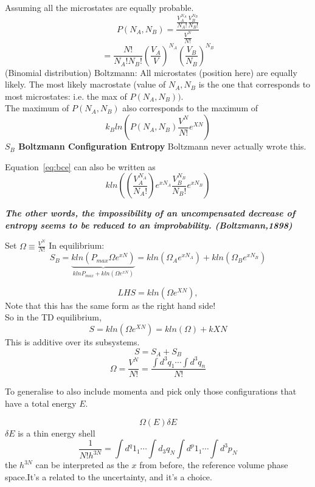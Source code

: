 \documentclass[11pt]{book}
\theoremstyle{definition}
\begin{document}
Assuming all the microstates are equally probable.
\[ P(N_A, N_B) = \frac{ \frac{V_A^{N_A}}{N_A!} \frac{V_B^{N_B}}{N_B!} } {\frac{V^{N}}{N!}}\] 
\[ = \frac{N!}{N_A!N_B!} \left( \frac{V_A}{V} \right) ^{N_A} \left( \frac{V_B}{N_B} \right)^{N_B}  \] 
(Binomial distribution)
Boltzmann: All microstates (position here) are equally likely. The most likely macrostate (value of $ N_A, N_B $ is the one that corresponds to most microstates: i.e. the max of $P(N_A, N_B))$. \\

The maximum of $ P(N_A,N_B) $ also corresponds to the maximum of
\begin{equation}
	\label{eq:bce}
	 k_Bln\left( P(N_A,N_B) \frac{V^N}{N!} e^{XN} \right)  
 \end{equation}
\textbf{ $ S_B $ Boltzmann Configuration Entropy } 
Boltzmann never actually wrote this.

Equation~\ref{eq:bce} can also be written as
\[ kln((\frac{V_A^{N_A}}{N_A!}) e^{xN_A} \frac{V_B^{N_B}}{N_B!} e^{xN_B}) \] 

\textbf{\textit{The other words, the impossibility of an uncompensated decrease of entropy seems to be reduced to an improbability. (Boltzmann,1898)}}

Set $ \Omega \equiv \frac{V^{N}}{N!} $ 
In equilibrium:
\[ S_B = \underbrace{kln(P_{max} \Omega e^{xN})}_{klnP_{max}+kln(\Omega e^{xN})} = kln( \Omega_A  e^{xN_A}) + kln(\Omega_B e^{xN_B})\] 

\[ LHS = kln(\Omega e^{XN}), \]
Note that this has the same form as the right hand side! \\
So in the TD equilibrium,
\begin{equation}
	S = kln(\Omega e^{XN}) = kln(\Omega) + kXN
\end{equation}
This is additive  over its subsystems.
\[ S = S_A + S_B \] 
\begin{equation}
	\Omega = \frac{V^{N}}{N!} = \frac{ \int d^3 q_1 \cdots \int d^3 q_n }{N!}
\end{equation}

To generalise to also include momenta and pick only those configurations that have a total energy $ E $.

\[ \Omega(E) \delta E \] $ \delta E $ is a thin energy shell
\[ \frac{1}{N! h^{3N}}= \int d^q 1_1 \cdots \int d_3 q_N \int d^p 1_1 \cdots  \int d^3 p_N\] 
the $ h^{3N} $ can be interpreted as the $ x $ from before, the reference volume phase space.It's a related to the uncertainty, and it's a choice.
\end{document}
